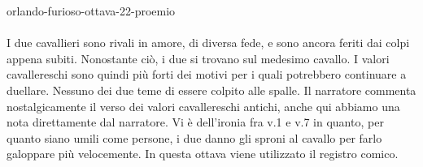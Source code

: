 \documentclass[preview]{standalone}
\begin{document}
\begin{snippet}{orlando-furioso-ottava-22-proemio}
    \\\\
    I due cavallieri sono rivali in amore, di diversa fede, e sono ancora
    feriti dai colpi appena subiti. Nonostante ciò, i due si trovano sul medesimo cavallo.
    I valori cavallereschi sono quindi più forti dei motivi per i quali
    potrebbero continuare a duellare. Nessuno dei due teme di essere colpito alle spalle.
    Il narratore commenta nostalgicamente il verso dei valori cavallereschi antichi,
    anche qui abbiamo una nota direttamente dal narratore.
    Vi è dell'ironia fra v.1 e v.7 in quanto, per quanto siano umili come persone, i due
    danno gli sproni al cavallo per farlo galoppare più velocemente.
    In questa ottava viene utilizzato il registro comico.
\end{snippet}
\end{document}
